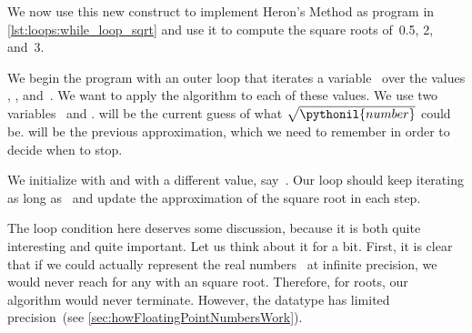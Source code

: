 We now use this new construct to implement Heron's Method as program  in \cref{lst:loops:while_loop_sqrt} and use it to compute the square roots of~0.5, 2, and~3.

We begin the program with an outer  loop that iterates a variable~ over the  values , , and~.
We want to apply the algorithm to each of these values.
We use two variables~ and .
 will be the current guess of what $\sqrt{\pythonil{number}}$ could be.
 will be the previous approximation, which we need to remember in order to decide when to stop.

We initialize  with  and  with a different value, say~.
Our  loop should keep iterating as long as~ and update the approximation of the square root in each step.

The loop condition here deserves some discussion, because it is both quite interesting and quite important.
Let us think about it for a bit.
First, it is clear that if we could actually represent the real numbers \realNumbers\ at infinite precision, we would never reach  for any  with an  square root.
Therefore, for  roots, our algorithm would never terminate.
However, the  datatype has limited precision~(see \cref{sec:howFloatingPointNumbersWork}).

